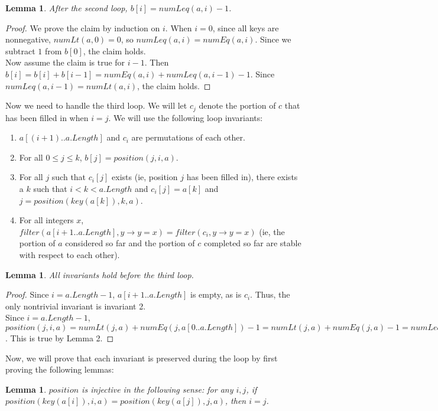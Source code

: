 \documentclass{article}
\newtheorem{lemma}[theorem]{Lemma}
\begin{document}
\begin{lemma}
After the second loop, $b[i] = numLeq(a, i) - 1$.
\end{lemma}
\begin{proof}
We prove the claim by induction on $i$. When $i=0$, since all keys are nonnegative, $numLt(a, 0) = 0$, so $numLeq(a,i) = numEq(a,i)$. Since we subtract $1$ from $b[0]$, the claim holds.
\\Now assume the claim is true for $i-1$. Then $b[i] = b[i] + b[i-1] = numEq(a, i) + numLeq(a, i-1) - 1$. Since $numLeq(a, i-1) = numLt(a, i)$, the claim holds.
\end{proof}
Now we need to handle the third loop. We will let $c_j$ denote the portion of $c$ that has been filled in when $i=j$.  We will use the following loop invariants:
\begin{enumerate}
\item
$a[(i+1)..a.Length]$ and $c_i$ are permutations of each other.
\item
For all $0 \leq j \leq k$, $b[j] = position(j, i, a)$.
\item
For all $j$ such that $c_i[j]$ exists (ie, position $j$ has been filled in), there exists a $k$ such that $i < k < a.Length$ and $c_i[j] = a[k]$ and $j = position(key(a[k]), k, a)$.
\item
For all integers $x$, $filter(a[i+1..a.Length], y \to y = x) = filter(c_i, y \to y = x)$ (ie, the portion of $a$ considered so far and the portion of $c$ completed so far are stable with respect to each other).
\end{enumerate}
\begin{lemma}
All invariants hold before the third loop.
\end{lemma}
\begin{proof}
Since $i= a.Length - 1$, $a[i+1..a.Length]$ is empty, as is $c_i$. Thus, the only nontrivial invariant is invariant 2.
\\Since $i=a.Length - 1$, $position(j, i, a) = numLt(j, a) + numEq(j, a[0..a.Length]) - 1 = numLt(j, a) + numEq(j, a) - 1 = numLeq(j,a) - 1$. This is true by Lemma 2.
\end{proof}
Now, we will prove that each invariant is preserved during the loop by first proving the following lemmas:
\begin{lemma}
$position$ is injective in the following sense: for any $i, j$, if $position(key(a[i]), i, a) = position(key(a[j]), j, a)$, then $i = j$.
\end{lemma}	
\end{document}
